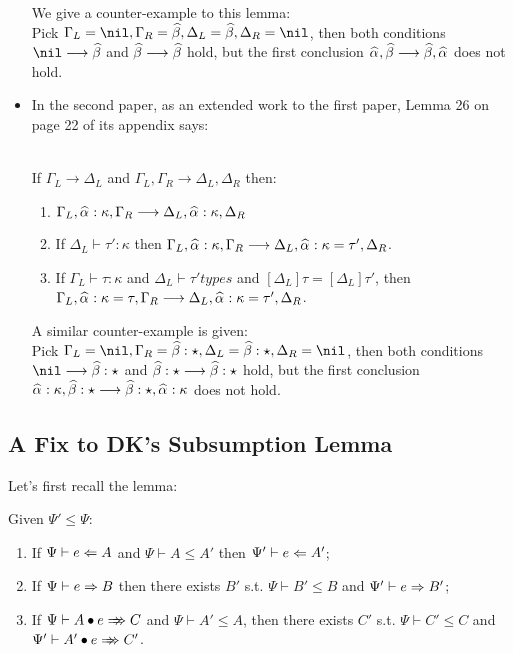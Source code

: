 \begin{itemize}
        We give a counter-example to this lemma:\\
        Pick $\Gm_L = \nil, \Gm_R = \bt, \Delta_L = \bt, \Delta_R = \nil$, then both conditions
        $\nil\longrightarrow \bt$ and $\bt\longrightarrow \bt$ hold, but the first conclusion
        $\al,\bt \longrightarrow \bt,\al$ does not hold.
    \item
        In the second paper, as an extended work to the first paper, Lemma 26 on page 22 of its appendix says:
        \begin{lemma}~\\
        If $\Gamma_L \longrightarrow \Delta_L$ and
        $\Gamma_L, \Gamma_R \longrightarrow \Delta_L, \Delta_R$ then:
        \begin{enumerate}
            \item $\Gamma_L,\al:\kappa,\Gamma_R \longrightarrow \Delta_L, \al:\kappa, \Delta_R$
            \item If $\Delta_L \vdash \tau' : \kappa$ then
                $\Gamma_L,\al:\kappa,\Gamma_R \longrightarrow \Delta_L, \al:\kappa = \tau', \Delta_R$.
            \item If $\Gamma_L \vdash \tau : \kappa$ and $\Delta_L \vdash \tau' types$ and
                $[\Delta_L]\tau = [\Delta_L]\tau'$, then
                $\Gamma_L, \al:\kappa = \tau, \Gamma_R \longrightarrow \Delta_L, \al:\kappa = \tau', \Delta_R$.
        \end{enumerate}
        \end{lemma}
        
        A similar counter-example is given:\\
        Pick $\Gm_L = \nil, \Gm_R = \bt:\star, \Delta_L = \bt:\star, \Delta_R = \nil$, then both conditions
        $\nil\longrightarrow \bt:\star$ and $\bt:\star\longrightarrow \bt:\star$ hold, but the first conclusion
        $\al:\kappa,\bt:\star \longrightarrow \bt:\star,\al:\kappa$ does not hold.
\end{itemize}

\subsection{A Fix to DK's Subsumption Lemma}
\label{appendix:subsumption}

Let's first recall the lemma:
\begin{lemma}[Subsumption]
Given $\Psi' \le \Psi$:
\begin{enumerate}
    \item If $\Psi \vdash e \Leftarrow A$ and $\Psi \vdash A \le A'$ then $\Psi' \vdash e \Leftarrow A'$;
    \item If $\Psi \vdash e \Rightarrow B$ then there exists
        $B'$ s.t. $\Psi \vdash B' \le B$ and $\Psi' \vdash e \Rightarrow B'$;
    \item If $\Psi \vdash \appInf{A}{e}{C}$ and $\Psi \vdash A' \le A$,
        then there exists $C'$ s.t. $\Psi \vdash C' \le C$ and $\Psi' \vdash \appInf{A'}{e}{C'}$.
\end{enumerate}
\end{lemma}

